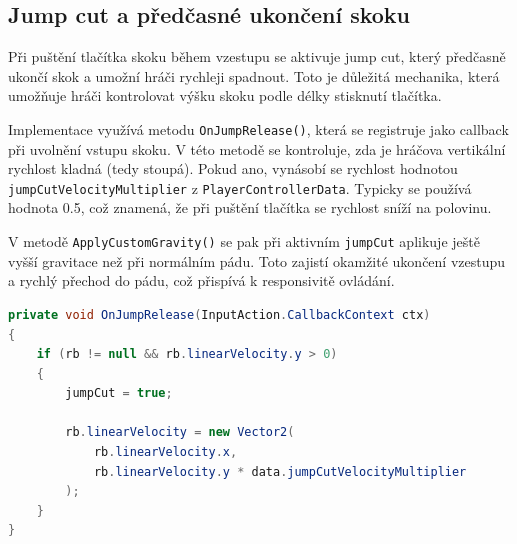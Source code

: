 \subsection{Jump cut a předčasné ukončení skoku}

Při puštění tlačítka skoku během vzestupu se aktivuje jump cut, který předčasně ukončí skok a umožní hráči rychleji spadnout. Toto je důležitá mechanika, která umožňuje hráči kontrolovat výšku skoku podle délky stisknutí tlačítka.

Implementace využívá metodu \texttt{OnJumpRelease()}, která se registruje jako callback při uvolnění vstupu skoku. V této metodě se kontroluje, zda je hráčova vertikální rychlost kladná (tedy stoupá). Pokud ano, vynásobí se rychlost hodnotou \texttt{jumpCutVelocityMultiplier} z \texttt{PlayerControllerData}. Typicky se používá hodnota 0.5, což znamená, že při puštění tlačítka se rychlost sníží na polovinu.

V metodě \texttt{ApplyCustomGravity()} se pak při aktivním \texttt{jumpCut} aplikuje ještě vyšší gravitace než při normálním pádu. Toto zajistí okamžité ukončení vzestupu a rychlý přechod do pádu, což přispívá k responsivitě ovládání.

\begin{lstlisting}[language=csharp,caption={Listing 8: Metoda OnJumpRelease pro jump cut}]
private void OnJumpRelease(InputAction.CallbackContext ctx)
{
    if (rb != null && rb.linearVelocity.y > 0)
    {
        jumpCut = true;

        rb.linearVelocity = new Vector2(
            rb.linearVelocity.x,
            rb.linearVelocity.y * data.jumpCutVelocityMultiplier
        );
    }
}
\end{lstlisting}
